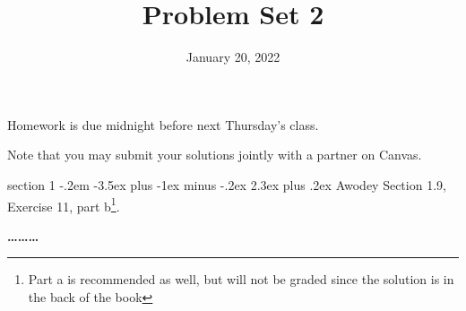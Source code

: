 \documentclass[12pt]{article}
\makeatletter
\newenvironment{problem}{\@startsection
       {section}
       {1}
       {-.2em}
       {-3.5ex plus -1ex minus -.2ex}
       {2.3ex plus .2ex}
       {\pagebreak[3]%
       \large\bf\noindent{Problem }
       }
       }
       {%
       \begin{center}\large\bf \ldots\ldots\ldots\end{center}}
\makeatother
\begin{document}
\newcommand{\skipp}{\textrm{skip}}
\newcommand{\Set}{\textrm{Set}}
\newcommand{\Cat}{\textrm{Cat}}
\newcommand{\Cayley}{\textrm{Cayley}}
\newcommand{\Preds}{\mathcal{P}}
\newcommand{\triple}[3]{\{#1\}{#2}\{#3\}}
\newcommand{\Triple}{\textrm{Triple}}
\newcommand{\Analyse}{\textrm{Analyse}}
\newcommand{\command}{\textrm{command}}

\newcommand{\id}{\textrm{id}}

\title{Problem Set 2}
\date{January 20, 2022}
\maketitle

Homework is due midnight before next Thursday's class.

Note that you may submit your solutions jointly with a partner on
Canvas.


\thispagestyle{empty}

\begin{problem}{}
  Awodey Section 1.9, Exercise 11, part b\footnote{Part a is
  recommended as well, but will not be graded since the solution is in
  the back of the book}.
\end{problem}
\end{document}
